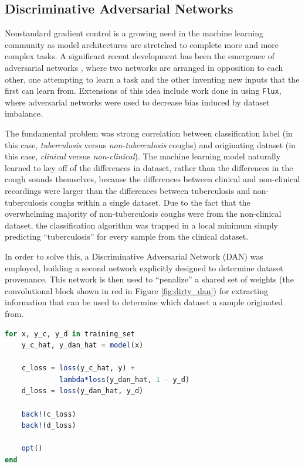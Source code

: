\documentclass{juliacon}
\begin{document}
\subsection{Discriminative Adversarial Networks}

Nonstandard gradient control is a growing need in the machine learning community as model architectures are stretched to complete more and more complex tasks.  A significant recent development has been the emergence of adversarial networks \cite{GANs}, where two networks are arranged in opposition to each other, one attempting to learn a task and the other inventing new inputs that the first can learn from.  Extensions of this idea include work done in \cite{Saba2018} using \texttt{Flux}, where adversarial networks were used to decrease bias induced by dataset imbalance.

The fundamental problem was strong correlation between classification label (in this case, \textit{tuberculosis} versus \textit{non-tuberculosis} coughs) and originating dataset (in this case, \textit{clinical} versus \textit{non-clinical}).  The machine learning model naturally learned to key off of the differences in dataset, rather than the differences in the cough sounds themselves, because the differences between clinical and non-clinical recordings were larger than the differences between tuberculosis and non-tuberculosis coughs within a single dataset.  Due to the fact that the overwhelming majority of non-tuberculosis coughs were from the non-clinical dataset, the classification algorithm was trapped in a local minimum simply predicting ``tuberculosis'' for every sample from the clinical dataset.

In order to solve this, a Discriminative Adversarial Network (DAN) was employed, building a second network explicitly designed to determine dataset provenance.  This network is then used to ``penalize'' a shared set of weights (the convolutional block shown in red in Figure \ref{fig:dirty_dan}) for extracting information that can be used to determine which dataset a sample originated from.

\begin{lstlisting}[language = Julia,
                  label={lst:dirty_dan_training_loop},
                  caption={DAN training loop},
                  captionpos=b]
for x, y_c, y_d in training_set
    y_c_hat, y_dan_hat = model(x)

    c_loss = loss(y_c_hat, y) +
             lambda*loss(y_dan_hat, 1 - y_d)
    d_loss = loss(y_dan_hat, y_d)
    
    back!(c_loss)
    back!(d_loss)
    
    opt()
end
\end{lstlisting}
\end{document}
